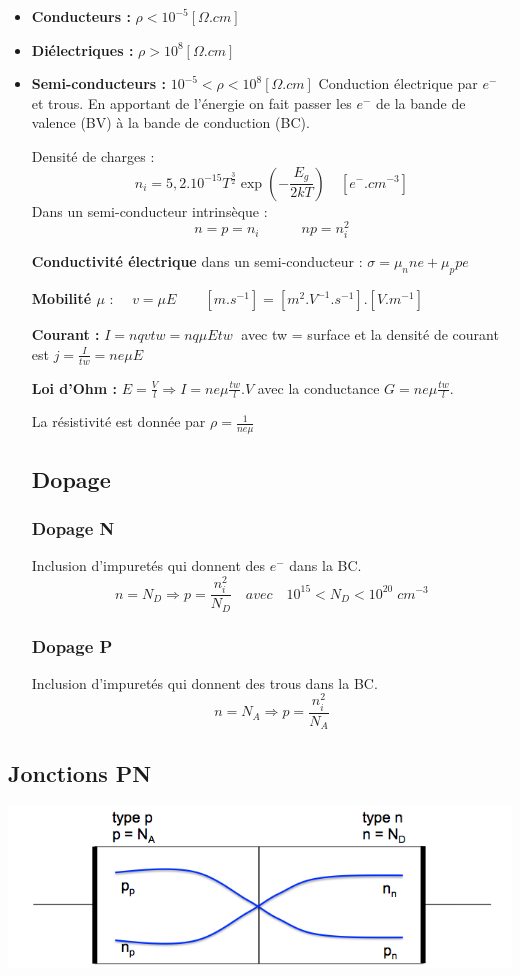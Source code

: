 \documentclass[]{article}
\begin{document}
\begin{itemize}
\item \textbf{Conducteurs :} $\rho < 10^{-5} [\Omega . cm]$ 
\item \textbf{Diélectriques :} $\rho > 10^{8} [\Omega . cm]$ 
\item \textbf{Semi-conducteurs :} $10^{-5} < \rho < 10^{8} [\Omega . cm]$  Conduction électrique par $e^-$ et trous.
 En apportant de l'énergie on fait passer les $e^-$ de la bande de valence (BV) à la bande de conduction (BC).

Densité de charges : $$ n_i = 5,2.10^{-15}T^{\frac{3}{2}} \exp{(-\frac{E_g}{2kT})} \quad [e^-.cm^{-3}] $$
Dans un semi-conducteur intrinsèque : $$ n = p = n_i \quad \quad \quad np = n_i^2 $$

\textbf{Conductivité électrique} dans un semi-conducteur : $\sigma = \mu_nne + \mu_ppe $

\textbf{Mobilité $\mu$} : $\quad v =\mu E\quad\quad [m.s^{-1}]=[m^2.V^{-1}.s^{-1}].[V.m^{-1}]$

\textbf{Courant :} $I = nqvtw=nq\mu Etw \;$ avec tw = surface et la densité de courant est $ j=\frac{I}{tw}=ne\mu E $

\textbf{Loi d'Ohm :} $ E = \frac{V}{l} \Rightarrow I= ne\mu \frac{tw}{l}.V $ avec la conductance $G=ne\mu \frac{tw}{l}$. 

La résistivité est donnée par $\rho=\frac{1}{ne\mu}$

\subsection{Dopage}
\subsubsection{Dopage N}
Inclusion d'impuretés qui donnent des $e^-$ dans la BC.
$$ n=N_D \Rightarrow p = \frac{n_i^2}{N_D} \quad avec \quad 10^{15} < N_D < 10^{20}\; cm^{-3}$$
\subsubsection{Dopage P}
Inclusion d'impuretés qui donnent des trous dans la BC.
$$  n=N_A \Rightarrow p = \frac{n_i^2}{N_A} $$

\end{itemize}

\subsection{Jonctions PN}
\includegraphics[scale=0.4]{pn}
\end{document}
